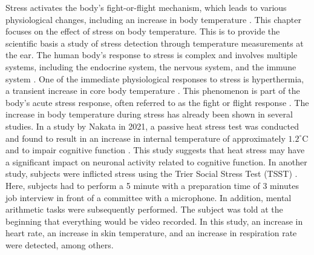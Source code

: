 Stress activates the body's fight-or-flight mechanism, which leads to various physiological changes, including an increase in body temperature \cite{marazzitiPsychologicalStressBody1992}. 
This chapter focuses on the effect of stress on body temperature. 
This is to provide the scientific basis a study of stress detection through temperature measurements at the ear.
The human body's response to stress is complex and involves multiple systems, including the endocrine system, the nervous system, and the immune system \cite{jamesUnderstandingRelationshipsPhysiological2023}. 
One of the immediate physiological responses to stress is hyperthermia, a transient increase in core body temperature \cite{vinkersEffectStressCore2013}. 
This phenomenon is part of the body's acute stress response, often referred to as the fight or flight response \cite{vinkersEffectStressCore2013}.
The increase in body temperature during stress has already been shown in several studies.
In a study by Nakata in 2021, a passive heat stress test was conducted and found to result in an increase in internal temperature of approximately $1.2 ^\circ\text{C}$ and to impair cognitive function \cite{nakataEffectsPassiveHeat2021}. 
This study suggests that heat stress may have a significant impact on neuronal activity related to cognitive function.
In another study, subjects were inflicted stress using the Trier Social Stress Test (TSST) \cite{vinkersEffectStressCore2013}. 
Here, subjects had to perform a 5 minute with a preparation time of 3 minutes job interview in front of a committee with a microphone. 
In addition, mental arithmetic tasks were subsequently performed. 
The subject was told at the beginning that everything would be video recorded.
In this study, an increase in heart rate, an increase in skin temperature, and an increase in respiration rate were detected, among others. 

